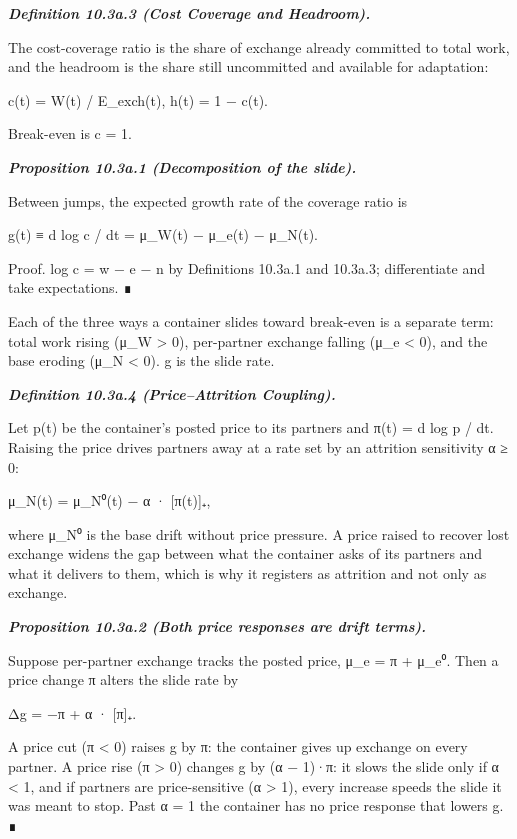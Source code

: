 \documentclass[
]{article}
\begin{document}
\emph{\textbf{Definition 10.3a.3 (Cost Coverage and Headroom).}}

The cost-coverage ratio is the share of exchange already committed to
total work, and the headroom is the share still uncommitted and
available for adaptation:

c(t) = W(t) / E\_exch(t), h(t) = 1 − c(t).

Break-even is c = 1.

\emph{\textbf{Proposition 10.3a.1 (Decomposition of the slide).}}

Between jumps, the expected growth rate of the coverage ratio is

g(t) ≡ d log c / dt = μ\_W(t) − μ\_e(t) − μ\_N(t).

Proof. log c = w − e − n by Definitions 10.3a.1 and 10.3a.3;
differentiate and take expectations. ∎

Each of the three ways a container slides toward break-even is a
separate term: total work rising (μ\_W \textgreater{} 0), per-partner
exchange falling (μ\_e \textless{} 0), and the base eroding (μ\_N
\textless{} 0). g is the slide rate.

\emph{\textbf{Definition 10.3a.4 (Price--Attrition Coupling).}}

Let p(t) be the container's posted price to its partners and π(t) = d
log p / dt. Raising the price drives partners away at a rate set by an
attrition sensitivity α ≥ 0:

μ\_N(t) = μ\_N⁰(t) − α · {[}π(t){]}₊,

where μ\_N⁰ is the base drift without price pressure. A price raised to
recover lost exchange widens the gap between what the container asks of
its partners and what it delivers to them, which is why it registers as
attrition and not only as exchange.

\emph{\textbf{Proposition 10.3a.2 (Both price responses are drift
terms).}}

Suppose per-partner exchange tracks the posted price, μ\_e = π + μ\_e⁰.
Then a price change π alters the slide rate by

Δg = −π + α · {[}π{]}₊.

A price cut (π \textless{} 0) raises g by \textbar π\textbar: the
container gives up exchange on every partner. A price rise (π
\textgreater{} 0) changes g by (α − 1)·π: it slows the slide only if α
\textless{} 1, and if partners are price-sensitive (α \textgreater{} 1),
every increase speeds the slide it was meant to stop. Past α = 1 the
container has no price response that lowers g. ∎
\end{document}
